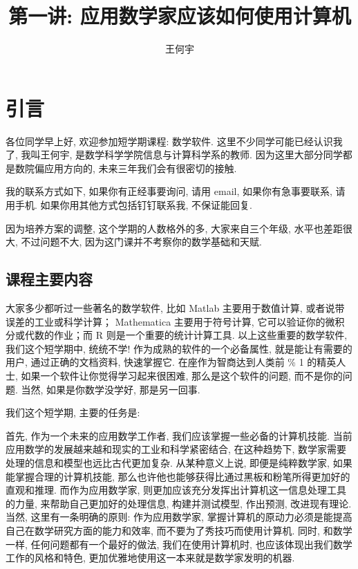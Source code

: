 \documentclass[a4paper]{ctexart}
\title{第一讲: 应用数学家应该如何使用计算机}
\author{王何宇}
\date{}
\begin{document}
\maketitle
\pagestyle{empty}

\section{引言}
各位同学早上好, 欢迎参加短学期课程: 数学软件. 这里不少同学可能已经认识我了,
我叫王何宇, 是数学科学学院信息与计算科学系的教师. 因为这里大部分同学都是数院偏应用方向的,
未来三年我们会有很密切的接触.

我的联系方式如下, 如果你有正经事要询问, 请用 email, 如果你有急事要联系, 请用手机.
如果你用其他方式包括钉钉联系我, 不保证能回复.   

因为培养方案的调整, 这个学期的人数格外的多, 大家来自三个年级, 水平也差距很大, 不过问题不大,
因为这门课并不考察你的数学基础和天赋.

\subsection{课程主要内容}

大家多少都听过一些著名的数学软件, 比如 Matlab 主要用于数值计算, 或者说带误差的工业或科学计算；
Mathematica 主要用于符号计算, 它可以验证你的微积分或代数的作业；而 R 则是一个重要的统计计算工具.
以上这些重要的数学软件, 我们这个短学期中, 统统不学! 作为成熟的软件的一个必备属性, 就是能让有需要的用户,
通过正确的文档资料, 快速掌握它. 在座作为智商达到人类前 \% 1 的精英人士, 如果一个软件让你觉得学习起来很困难,
那么是这个软件的问题, 而不是你的问题. 当然, 如果是你数学没学好, 那是另一回事. 

我们这个短学期, 主要的任务是:

首先, 作为一个未来的应用数学工作者, 我们应该掌握一些必备的计算机技能.
当前应用数学的发展越来越和现实的工业和科学紧密结合, 在这种趋势下, 数学家需要处理的信息和模型也远比古代更加复杂.
从某种意义上说, 即便是纯粹数学家, 如果能掌握合理的计算机技能,
那么也许他也能够获得比通过黑板和粉笔所得更加好的直观和推理. 而作为应用数学家,
则更加应该充分发挥出计算机这一信息处理工具的力量, 来帮助自己更加好的处理信息, 构建并测试模型, 作出预测,
改进现有理论. 当然, 这里有一条明确的原则: 作为应用数学家,
掌握计算机的原动力必须是能提高自己在数学研究方面的能力和效率, 而不要为了秀技巧而使用计算机. 同时, 和数学一样,
任何问题都有一个最好的做法, 我们在使用计算机时, 也应该体现出我们数学工作的风格和特色,
更加优雅地使用这一本来就是数学家发明的机器.
\end{document}
